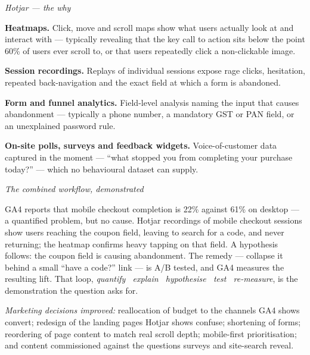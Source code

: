 \begin{qlist}
\textit{Hotjar --- the why}
\begin{apts}\setcounter{enumi}{5}
\item \textbf{Heatmaps.} Click, move and scroll maps show what users actually
      look at and interact with --- typically revealing that the key call to
      action sits below the point 60\% of users ever scroll to, or that users
      repeatedly click a non-clickable image.
\item \textbf{Session recordings.} Replays of individual sessions expose rage
      clicks, hesitation, repeated back-navigation and the exact field at which
      a form is abandoned.
\item \textbf{Form and funnel analytics.} Field-level analysis naming the input
      that causes abandonment --- typically a phone number, a mandatory GST or
      PAN field, or an unexplained password rule.
\item \textbf{On-site polls, surveys and feedback widgets.} Voice-of-customer
      data captured in the moment --- ``what stopped you from completing your
      purchase today?'' --- which no behavioural dataset can supply.
\end{apts}

\textit{The combined workflow, demonstrated}
\begin{apts}\setcounter{enumi}{9}
\item GA4 reports that mobile checkout completion is 22\% against 61\% on
      desktop --- a quantified problem, but no cause. Hotjar recordings of
      mobile checkout sessions show users reaching the coupon field, leaving to
      search for a code, and never returning; the heatmap confirms heavy
      tapping on that field. A hypothesis follows: the coupon field is causing
      abandonment. The remedy --- collapse it behind a small ``have a code?''
      link --- is A/B tested, and GA4 measures the resulting lift. That loop,
      \emph{quantify \ra\ explain \ra\ hypothesise \ra\ test \ra\ re-measure},
      is the demonstration the question asks for.
\end{apts}

\textit{Marketing decisions improved:} reallocation of budget to the channels
GA4 shows convert; redesign of the landing pages Hotjar shows confuse;
shortening of forms; reordering of page content to match real scroll depth;
mobile-first prioritisation; and content commissioned against the questions
surveys and site-search reveal.


\end{qlist}
